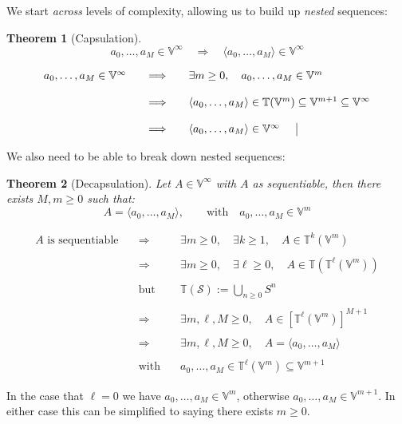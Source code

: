 \documentclass[twoside]{article}
\newcommand{\nthpt}[2][T]{\ensuremath{\mathbb{#1}^{#2}}}
\newcommand{\nthut}[2][V]{\ensuremath{\mathbb{#1}^{#2}}}
\newcommand{\restratified}{\ensuremath{\mathbb{V}^\infty}}
\newcommand{\of}[1]{\ensuremath{(\mathcal{#1})}}
\newcommand{\then}{\ensuremath{\quad\Longrightarrow\quad}}
\newcommand{\but}{\ensuremath{\quad\mbox{but}\quad}}
\newcommand{\with}{\ensuremath{\quad\mbox{with}\quad}}
\newtheorem{theorem}{Theorem}
\newenvironment{proof}[1][Proof]{\begin{trivlist}
\item[\hskip \labelsep {\bfseries #1}]}{\end{trivlist}}
\newcommand{\qed}{\nobreak \ifvmode \relax \else
      \ifdim\lastskip<1.5em \hskip-\lastskip
      \hskip1.5em plus0em minus0.5em \fi \nobreak
      \vrule height0.75em width0.5em depth0.25em\fi}
\begin{document}
We start \emph{across} levels of complexity, allowing us to build up \emph{nested} sequences:

\begin{theorem}[Capsulation]
$$ a_0,\ldots,a_M\in\restratified\then\langle a_0,\ldots,a_M\rangle\in\restratified $$
\end{theorem}

\begin{proof}
$$ \begin{array}{rcl}
a_0,\ldots,a_M\in\restratified	& \then	& \exists m\ge 0,\quad a_0,\ldots,a_M\in\nthut{m}			\\
														\\
				& \then & \langle a_0,\ldots,a_M\rangle\in\mathbb{T}(\nthut{m})
                                          \subseteq\nthut{m+1}\subseteq\restratified				\\
														\\
				& \then & \langle a_0,\ldots,a_M\rangle\in\restratified\qed 
\end{array} $$
\end{proof}

We also need to be able to break down nested sequences:

\begin{theorem}[Decapsulation]
Let $ A\in\restratified $ with $ A $ as sequentiable, then there exists $ M, m\ge 0 $ such that:
$$ A=\langle a_0,\ldots, a_M\rangle,\qquad\mbox{with}\quad a_0,\ldots, a_M\in\nthut{m}  $$
\end{theorem}

\begin{proof}
$$ \begin{array}{rcl}
A\mbox{ is sequentiable}	& \then & \exists m\ge 0,\quad\exists k\ge 1,\quad A\in\nthpt{k}(\nthut{m})			\\
																\\
				& \then & \exists m\ge 0,\quad\exists\ell\ge 0,\quad A\in\mathbb{T}(\nthpt{\ell}(\nthut{m}))	\\
																\\
				& \but	& \mathbb{T}\of{S}:=\bigcup_{n\ge 0}S^n							\\
																\\
				& \then & \exists m,\ell,M\ge 0,\quad A\in[\nthpt{\ell}(\nthut{m})]^{M+1}			\\
																\\
				& \then & \exists m,\ell,M\ge 0,\quad A=\langle a_0,\ldots,a_M\rangle				\\
																\\
				& \with & a_0,\ldots,a_M\in\nthpt{\ell}(\nthut{m})\subseteq\nthut{m+1}
\end{array} $$

In the case that $ \ell=0 $ we have $ a_0,\ldots,a_M\in\nthut{m} $, otherwise $ a_0,\ldots,a_M\in\nthut{m+1} $. In either
case this can be simplified to saying there exists $ m\ge 0 $.\qed
\end{proof}
\end{document}
